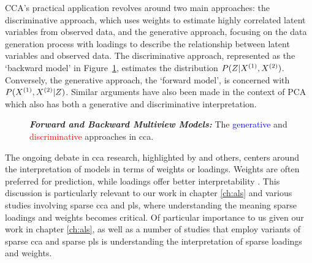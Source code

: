CCA's practical application revolves around two main approaches: the discriminative approach, which uses weights to estimate highly correlated latent variables from observed data, and the generative approach, focusing on the data generation process with loadings to describe the relationship between latent variables and observed data.
The discriminative approach, represented as the `backward model' in Figure~\ref{fig:forward-backward-models}, estimates the distribution $P(Z|X^{(1)},X^{(2)})$.
Conversely, the generative approach, the `forward model', is concerned with $P(X^{(1)},X^{(2)}|Z)$.
Similar arguments have also been made in the context of PCA \citep{park2023critical} which also has both a generative \citep{tipping1999probabilistic} and discriminative\citep{hotelling1933analysis} interpretation.

\begin{figure}
    \centering
    \caption[Forward and Backward Multiview Models]{\textit{\textbf{Forward and Backward Multiview Models:}} The \textcolor{blue}{generative} and \textcolor{red}{discriminative} approaches in \acrshort{cca}.}\label{fig:forward-backward-models}
\end{figure}

The ongoing debate in \acrshort{cca} research, highlighted by \citet{gu2018simultaneous} and others, centers around the interpretation of models in terms of weights or loadings.
Weights are often preferred for prediction, while loadings offer better interpretability \citep{liu2022improved}.
This discussion is particularly relevant to our work in chapter \ref{ch:als} and various studies involving sparse \acrshort{cca} and \acrshort{pls}, where understanding the meaning sparse loadings and weights becomes critical.
Of particular importance to us given our work in chapter \ref{ch:als}, as well as a number of studies that employ variants of sparse \acrshort{cca} and sparse \acrshort{pls} is understanding the interpretation of sparse loadings and weights.

